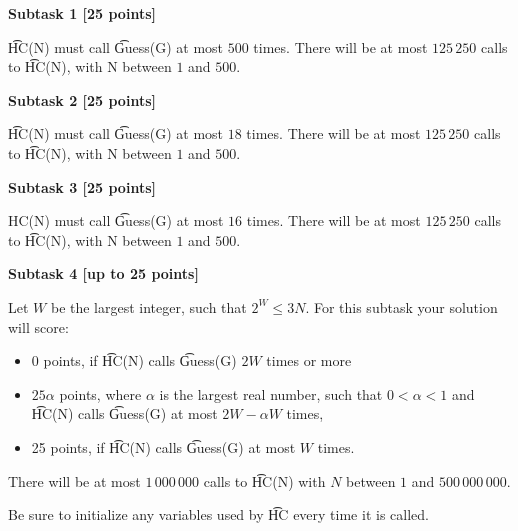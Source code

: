 {\bf Subtask 1 [25 points]}

\t{HC(N)} must call \t{Guess(G)} at most $500$ times. There will be at most $125\,250$ calls to \t{HC(N)}, with N between $1$ and $500$.

{\bf Subtask 2 [25 points]}

\t{HC(N)} must call \t{Guess(G)} at most $18$ times. There will be at most $125\,250$ calls to \t{HC(N)}, with N between $1$ and $500$.

{\bf Subtask 3 [25 points]}

HC(N) must call \t{Guess(G)} at most $16$ times. There will be at most $125\,250$ calls to \t{HC(N)}, with N between $1$ and $500$.

{\bf Subtask 4 [up to 25 points]}

Let $W$ be the largest integer, such that $2^W \le 3 N$. For this subtask your solution will score:
\begin{itemize}
\item $0$ points, if \t{HC(N)} calls \t{Guess(G)} $2W$ times or more
\item $25\alpha$ points, where $\alpha$ is the largest real number, such that $0 < \alpha < 1$
and \t{HC(N)} calls \t{Guess(G)} at most $2W-\alpha W$ times,
\item 25 points, if \t{HC(N)} calls \t{Guess(G)} at most $W$ times.
\end{itemize}

There will be at most $1\,000\,000$ calls to \t{HC(N)} with $N$ between $1$ and $500\,000\,000$.

Be sure to initialize any variables used by \t{HC} every time it is called.
